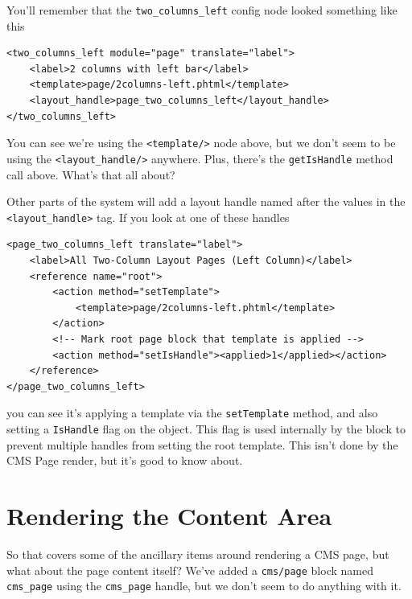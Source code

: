 \documentclass[oneside]{book}
\begin{document}
You'll remember that the \footnotesize\texttt{two\_columns\_left} \normalsize  config node looked something like this

\begin{lstlisting}
<two_columns_left module="page" translate="label">
    <label>2 columns with left bar</label>
    <template>page/2columns-left.phtml</template>
    <layout_handle>page_two_columns_left</layout_handle>
</two_columns_left>

\end{lstlisting}


You can see we're using the \footnotesize\texttt{\textless template/\textgreater } \normalsize  node above, but we don't seem to be using the \footnotesize\texttt{\textless layout\_handle/\textgreater } \normalsize  anywhere.  Plus, there's the \footnotesize\texttt{getIsHandle} \normalsize  method call above.  What's that all about?

Other parts of the system will add a layout handle named after the values in the \footnotesize\texttt{\textless layout\_handle\textgreater } \normalsize  tag. If you look at one of these handles

\begin{lstlisting}
<page_two_columns_left translate="label">
    <label>All Two-Column Layout Pages (Left Column)</label>
    <reference name="root">
        <action method="setTemplate">
            <template>page/2columns-left.phtml</template>
        </action>
        <!-- Mark root page block that template is applied -->
        <action method="setIsHandle"><applied>1</applied></action>
    </reference>
</page_two_columns_left>

\end{lstlisting}


you can see it's applying a template via the \footnotesize\texttt{setTemplate} \normalsize  method, and also setting a \footnotesize\texttt{IsHandle} \normalsize  flag on the object.  This flag is used internally by the block to prevent multiple handles from setting the root template.  This isn't done by the CMS Page render, but it's good to know about.

\section{Rendering the Content Area}

So that covers some of the ancillary items around rendering a CMS page, but what about the page content itself?  We've added a \footnotesize\texttt{cms/page} \normalsize  block named \footnotesize\texttt{cms\_page} \normalsize  using the \footnotesize\texttt{cms\_page} \normalsize  handle, but we don't seem to do anything with it.
\end{document}

